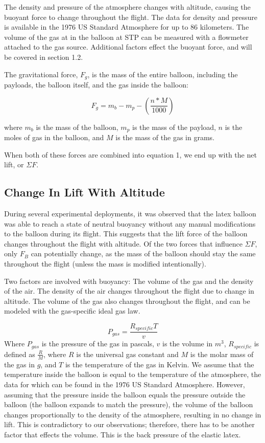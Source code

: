 \documentclass[usenatbib]{mn2e}
\newcommand{\f}[2]{\frac{#1}{#2}}
\begin{document}
The density and pressure of the atmosphere changes with altitude, causing the buoyant force to change throughout the flight. The data for density and pressure is available in the 1976 US Standard Atmosphere for up to 86 kilometers. The volume of the gas at in the balloon at STP can be measured with a flowmeter attached to the gas source. Additional factors effect the buoyant force, and will be covered in section 1.2.

The gravitational force, $F_g$, is the mass of the entire balloon, including the payloads, the balloon itself, and the gas inside the balloon:

\begin{equation}
F_{g}=m_b-m_p-(\f{n*M}{1000})
\end{equation}

where $m_b$ is the mass of the balloon, $m_p$ is the mass of the payload, $n$ is the moles of gas in the balloon, and $M$ is the mass of the gas in grams.

When both of these forces are combined into equation 1, we end up with the net lift, or $\Sigma F$.

\subsection{Change In Lift With Altitude}
\label{sec:backpressure}

During several experimental deployments, it was observed that the latex balloon was able to reach a state of neutral buoyancy without any manual modifications to the balloon during its flight. This suggests that the lift force of the balloon changes throughout the flight with altitude. Of the two forces that influence $\Sigma F$, only $F_B$ can potentially change, as the mass of the balloon should stay the same throughout the flight (unless the mass is modified intentionally).

Two factors are involved with buoyancy: The volume of the gas and the density of the air. The density of the air changes throughout the flight due to change in altitude. The volume of the gas also changes throughout the flight, and can be modeled with the gas-specific ideal gas law. 

\begin{equation}
P_{gas} = \frac{R_{specific}T}{v}
\end{equation}
Where $P_{gas}$ is the pressure of the gas in pascals, $v$ is the volume in $m^3$, $R_{specific}$ is defined as $\frac{R}{M}$, where $R$ is the universal gas constant and $M$ is the molar mass of the gas in $g$, and $T$ is the temperature of the gas in Kelvin. We assume that the temperature inside the balloon is equal to the temperature of the atmosphere, the data for which can be found in the 1976 US Standard Atmosphere.
However, assuming that the pressure inside the balloon equals the pressure outside the balloon (the balloon expands to match the pressure), the volume of the balloon changes proportionally to the density of the atmosphere, resulting in no change in lift. This is contradictory to our observations; therefore, there has to be another factor that effects the volume. This is the back pressure of the elastic latex. 
\end{document}
